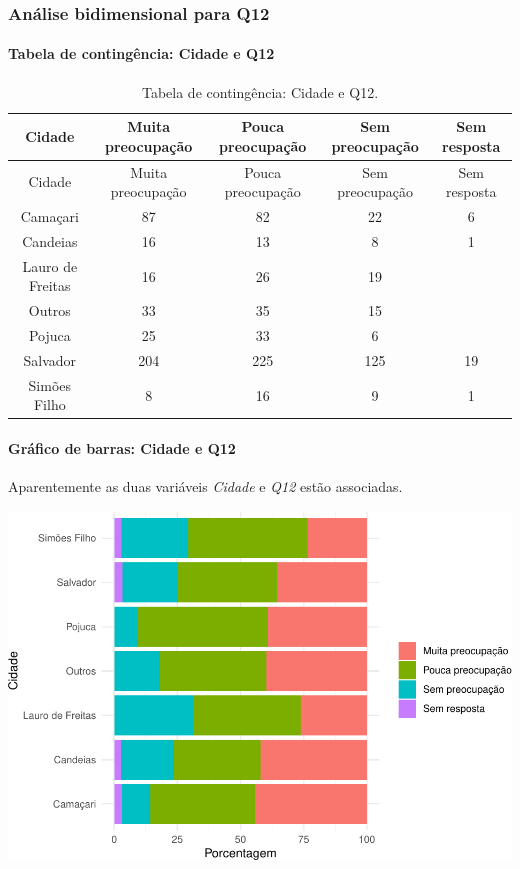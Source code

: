 \documentclass[]{article}
\let\oldparagraph\paragraph
\renewcommand{\paragraph}[1]{\oldparagraph{#1}\mbox{}}
\begin{document}
\cleardoublepage

\hypertarget{anuxe1lise-bidimensional-para-q12}{%
\subsubsection{Análise bidimensional para Q12}\label{anuxe1lise-bidimensional-para-q12}}

\hypertarget{tabela-de-continguxeancia-cidade-e-q12}{%
\paragraph{Tabela de contingência: Cidade e Q12}\label{tabela-de-continguxeancia-cidade-e-q12}}

\begin{longtable}[]{@{}ccccc@{}}
\caption{\label{tab:unnamed-chunk-17}Tabela de contingência: Cidade e Q12.}\tabularnewline
\toprule
Cidade & Muita preocupação & Pouca preocupação & Sem preocupação & Sem resposta\tabularnewline
\midrule
\endfirsthead
\toprule
Cidade & Muita preocupação & Pouca preocupação & Sem preocupação & Sem resposta\tabularnewline
\midrule
\endhead
Camaçari & 87 & 82 & 22 & 6\tabularnewline
Candeias & 16 & 13 & 8 & 1\tabularnewline
Lauro de Freitas & 16 & 26 & 19 &\tabularnewline
Outros & 33 & 35 & 15 &\tabularnewline
Pojuca & 25 & 33 & 6 &\tabularnewline
Salvador & 204 & 225 & 125 & 19\tabularnewline
Simões Filho & 8 & 16 & 9 & 1\tabularnewline
\bottomrule
\end{longtable}

\hypertarget{gruxe1fico-de-barras-cidade-e-q12}{%
\paragraph{Gráfico de barras: Cidade e Q12}\label{gruxe1fico-de-barras-cidade-e-q12}}

Aparentemente as duas variáveis \emph{Cidade} e \emph{Q12} estão associadas.

\begin{center}\includegraphics[width=0.75\linewidth]{relatorio_files/figure-latex/unnamed-chunk-18-1} \end{center}
\end{document}
